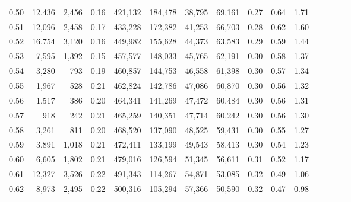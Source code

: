 \begin{tabular}{rrrcrrrrrrrrrrr}
0.50 &  12,436 &   2,456 &                                       0.16 &  421,132 &  184,478 &   38,795 &   69,161 &  0.27 &  0.64 &                         1.71 \\
0.51 &  12,096 &   2,458 &                                       0.17 &  433,228 &  172,382 &   41,253 &   66,703 &  0.28 &  0.62 &                         1.60 \\
0.52 &  16,754 &   3,120 &                                       0.16 &  449,982 &  155,628 &   44,373 &   63,583 &  0.29 &  0.59 &                         1.44 \\
0.53 &   7,595 &   1,392 &                                       0.15 &  457,577 &  148,033 &   45,765 &   62,191 &  0.30 &  0.58 &                         1.37 \\
0.54 &   3,280 &     793 &                                       0.19 &  460,857 &  144,753 &   46,558 &   61,398 &  0.30 &  0.57 &                         1.34 \\
0.55 &   1,967 &     528 &                                       0.21 &  462,824 &  142,786 &   47,086 &   60,870 &  0.30 &  0.56 &                         1.32 \\
0.56 &   1,517 &     386 &                                       0.20 &  464,341 &  141,269 &   47,472 &   60,484 &  0.30 &  0.56 &                         1.31 \\
0.57 &     918 &     242 &                                       0.21 &  465,259 &  140,351 &   47,714 &   60,242 &  0.30 &  0.56 &                         1.30 \\
0.58 &   3,261 &     811 &                                       0.20 &  468,520 &  137,090 &   48,525 &   59,431 &  0.30 &  0.55 &                         1.27 \\
0.59 &   3,891 &   1,018 &                                       0.21 &  472,411 &  133,199 &   49,543 &   58,413 &  0.30 &  0.54 &                         1.23 \\
0.60 &   6,605 &   1,802 &                                       0.21 &  479,016 &  126,594 &   51,345 &   56,611 &  0.31 &  0.52 &                         1.17 \\
0.61 &  12,327 &   3,526 &                                       0.22 &  491,343 &  114,267 &   54,871 &   53,085 &  0.32 &  0.49 &                         1.06 \\
0.62 &   8,973 &   2,495 &                                       0.22 &  500,316 &  105,294 &   57,366 &   50,590 &  0.32 &  0.47 &                         0.98 \\

\end{tabular}
